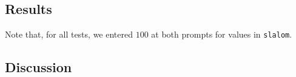 
\subsection{Results}

Note that, for all tests, we entered $100$ at both prompts for values in
\texttt{slalom}.



\subsection{Discussion}
